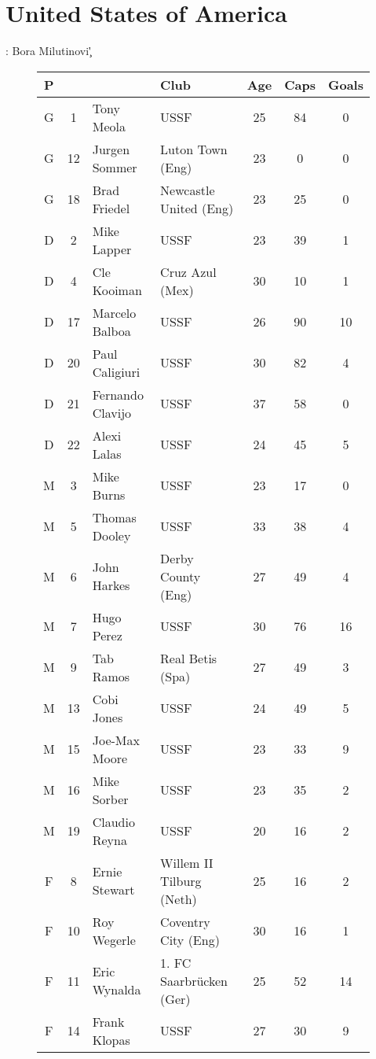 \chapter{United States of America}
\newline
\newline
\Coach: Bora Milutinovi{\c'}
\begin{figure}[H]
\begin{tabular}{c c l l c c c}
P & & & Club & Age & Caps & Goals \\ \hline
G & 1 & Tony Meola & USSF & 25 & 84 & 0 \\
G & 12 & Jurgen Sommer & Luton Town (Eng) & 23 & 0 & 0 \\
G & 18 & Brad Friedel & Newcastle United (Eng) & 23 & 25 & 0 \\ \hline
D & 2 & Mike Lapper & USSF & 23 & 39 & 1 \\
D & 4 & Cle Kooiman & Cruz Azul (Mex) & 30 & 10 & 1 \\
D & 17 & Marcelo Balboa & USSF & 26 & 90 & 10 \\
D & 20 & Paul Caligiuri & USSF & 30 & 82 & 4 \\
D & 21 & Fernando Clavijo & USSF & 37 & 58 & 0 \\
D & 22 & Alexi Lalas & USSF & 24 & 45 & 5 \\ \hline
M & 3 & Mike Burns & USSF & 23 & 17 & 0 \\
M & 5 & Thomas Dooley & USSF & 33 & 38 & 4 \\
M & 6 & John Harkes & Derby County (Eng) & 27 & 49 & 4 \\
M & 7 & Hugo Perez & USSF & 30 & 76 & 16 \\
M & 9 & Tab Ramos & Real Betis (Spa) & 27 & 49 & 3 \\
M & 13 & Cobi Jones & USSF & 24 & 49 & 5 \\
M & 15 & Joe-Max Moore & USSF & 23 & 33 & 9 \\
M & 16 & Mike Sorber & USSF & 23 & 35 & 2 \\
M & 19 & Claudio Reyna & USSF & 20 & 16 & 2 \\ \hline
F & 8 & Ernie Stewart & Willem II Tilburg (Neth) & 25 & 16 & 2 \\
F & 10 & Roy Wegerle & Coventry City (Eng) & 30 & 16 & 1 \\
F & 11 & Eric Wynalda & 1. FC Saarbr{\"u}cken (Ger) & 25 & 52 & 14 \\  %
F & 14 & Frank Klopas & USSF & 27 & 30 & 9 \\ \hline
\end{tabular}
\end{figure}
